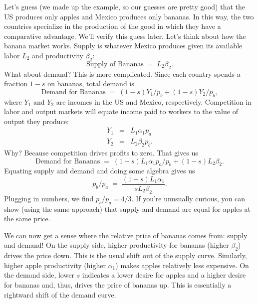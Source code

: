 Let's guess (we made up the example, so our guesses are pretty good)
that the US produces only apples and  Mexico produces only bananas.
In this way, the two countries specialize in the
production of the good in which they have a comparative advantage.
We'll verify this guess later.
Let's think about how the banana market works.
Supply is whatever Mexico produces given its
available labor $L_2$ and productivity $\beta_2$:
\[
    \mbox{Supply of Bananas}  \;=\;  L_2 \beta_2  .
\]
What about demand?  This is more complicated.
Since each country spends a fraction $1-s$ on bananas,
total demand is
\[
    \mbox{Demand for Bananas}  \;=\;  (1-s) Y_1/p_b + (1-s) Y_2/p_b ,
\]
where $Y_1$ and $Y_2$ are incomes in the US and Mexico,
respectively.
Competition in labor and output markets will equate
income paid to workers to the value of output they produce:
\begin{eqnarray*}
    Y_1 &=&  L_1 \alpha_1 p_a \\
    Y_2 &=& L_2 \beta_2 p_b .
\end{eqnarray*}
Why?  Because competition drives profits to zero.
That gives us
\[
    \mbox{Demand for Bananas}  \;=\;  (1-s) L_1 \alpha_1 p_a/p_b
                + (1-s) L_2 \beta_2  .
\]
Equating supply and demand and doing some algebra gives us
\begin{equation}
    p_b/p_a  \;=\;  \frac{ (1-s) L_1 \alpha_1 }{ s L_2 \beta_2 } .
    \label{eq:equilprice}
\end{equation}
Plugging in numbers, we find $ p_b/p_a = 4/3 $.
If you're unusually curious,
you can show (using the same approach)
that supply and demand are equal for apples at the same price.


We can now get a sense where the relative price
of bananas comes from:  supply and demand!
On the supply side,  higher productivity for bananas (higher $\beta_2$)
drives the price down.
This is the usual shift out of the supply curve.
Similarly, higher apple productivity (higher $\alpha_1$)
makes apples relatively less expensive.
On the demand side,  lower  $s$ indicates a lower desire for apples and a higher
desire for bananas and, thus,  drives the price of bananas up.
This is essentially a rightward shift of the demand curve.




